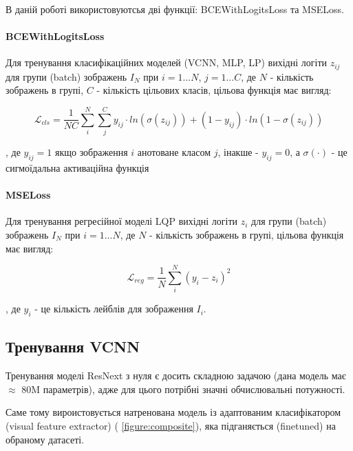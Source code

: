 \documentclass{udstu}
\begin{document}
В даній роботі використовуютсья дві функції: BCEWithLogitsLoss та MSELoss.

\paragraph{\textbf{BCEWithLogitsLoss}\\}

Для тренування класифікаційних моделей (VCNN, MLP, LP) вихідні логіти $z_{ij}$
для групи (batch) зображень $I_N$ при $i = 1...N$, $j = 1...C$,
де $N$ - кількість зображень в групі, $C$ - кількість цільових класів,
цільова функція має вигляд:

\begin{equation}
\mathcal{L}_{cls} = \frac{1}{NC} \sum_{i}^{N} \sum_{j}^{C}
y_{ij} \cdot ln(\sigma(z_{ij})) + (1 - y_{ij}) \cdot ln(1 - \sigma(z_{ij}))
\end{equation}

, де $y_{ij} = 1$ якщо зображення $i$ анотоване класом $j$, інакше - $y_{ij} = 0$,
а $\sigma(\cdot)$ - це сигмоїдальна активаційна функція

\paragraph{\textbf{MSELoss}\\}

Для тренування регресійної моделі LQP вихідні логіти $z_i$
для групи (batch) зображень $I_N$ при $i = 1...N$,
де $N$ - кількість зображень в групі,
цільова функція має вигляд:

\begin{equation}
\mathcal{L}_{reg} = \frac{1}{N} \sum_{i}^{N}
(y_i - z_i)^2
\end{equation}

, де $y_i$ - це кількість лейблів для зображення $I_i$.


\subsection{Тренування VCNN}

Тренування моделі ResNext \cite{resnext} з нуля є досить складною задачою (дана модель має $\approx$ 80M параметрів),
адже для цього потрібні значні обчислювальні потужності.

Саме тому вироистовується натренована модель із адаптованим класифікатором (visual feature extractor) (\figurename{ \ref{figure:composite}}), яка підганяється (finetuned) на обраному датасеті.
\end{document}
